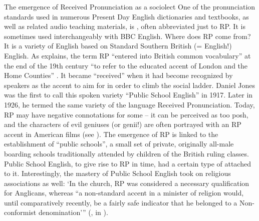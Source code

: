 \begin{varietybox}{The emergence of Received Pronunciation as a sociolect}
One of the pronunciation standards used in numerous Present Day English dictionaries and textbooks, as well as related audio teaching materials, is , often abbreviated just to RP. It is sometimes used interchangeably with BBC English. Where does RP come from? It is a variety of English based on Standard Southern British (= English!) English. As \citet{Fennell2001} explains, the term RP ``entered into British common vocabulary'' at the end of the 19th century ``to refer to the educated accent of London and the Home Counties'' \citep[185]{Fennell2001}. It became ``received'' when it had become recognized by speakers as the accent to aim for in order to climb the social ladder. Daniel Jones was the first to call this spoken variety ``Public School English'' in 1917. Later in 1926, he termed the same variety of the language Received Pronunciation. Today, RP may have negative connotations for some -- it can be perceived as too posh, and the characters of evil geniuses (or genii!) are often portrayed with an RP accent in American films (see \citealp{Lippi2012}). The emergence of RP is linked to the establishment of ``public schools'', a small set of private, originally all-male boarding schools traditionally attended by children of the British ruling classes. Public School English, to give rise to RP in time, had a certain type of  attached to it. Interestingly, the mastery of Public School English took on religious associations as well: `In the church, RP was considered a necessary qualification for Anglicans, whereas ``a non-standard accent in a minister of religion would, until comparatively recently, be a fairly safe indicator that he belonged to a Non-conformist denomination'{''} (\citealp[34]{Honey1989}, in \citealp[61]{Gorlach1999}). 
\end{varietybox}


